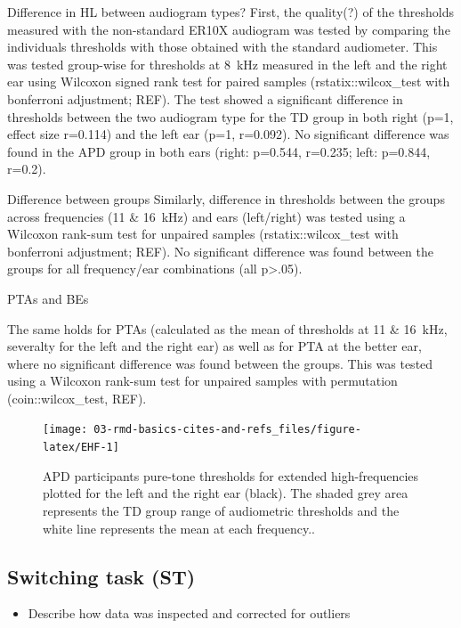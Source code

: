 \documentclass[a4paper,nobind]{templates/ociamthesis}
\providecommand{\tightlist}{%
  \setlength{\itemsep}{0pt}\setlength{\parskip}{0pt}}
\begin{document}
{Difference in HL between audiogram types?} First, the quality(?) of the
thresholds measured with the non-standard ER10X audiogram was tested by
comparing the individuals thresholds with those obtained with the
standard audiometer. This was tested group-wise for thresholds at 8~kHz
measured in the left and the right ear using Wilcoxon signed rank test
for paired samples (rstatix::wilcox\_test with bonferroni adjustment;
REF). The test showed a significant difference in thresholds between the
two audiogram type for the TD group in both right (p=1, effect size
r=0.114) and the left ear (p=1, r=0.092). No significant difference was
found in the APD group in both ears (right: p=0.544, r=0.235; left:
p=0.844, r=0.2).

{Difference between groups} Similarly, difference in thresholds between
the groups across frequencies (11 \& 16~kHz) and ears (left/right) was
tested using a Wilcoxon rank-sum test for unpaired samples
(rstatix::wilcox\_test with bonferroni adjustment; REF). No significant
difference was found between the groups for all frequency/ear
combinations (all p\textgreater.05).

{PTAs and BEs}

The same holds for PTAs (calculated as the mean of thresholds at 11 \&
16~kHz, severalty for the left and the right ear) as well as for PTA at
the better ear, where no significant difference was found between the
groups. This was tested using a Wilcoxon rank-sum test for unpaired
samples with permutation (coin::wilcox\_test, REF).

\begin{figure}

{\centering \texttt{[image: 03-rmd-basics-cites-and-refs\_files/figure-latex/EHF-1]} 

}

\caption{APD participants pure-tone thresholds for extended high-frequencies plotted for the left and the right ear (black). The shaded grey area represents the TD group range of audiometric thresholds and the white line represents the mean at each frequency..}\label{fig:EHF}
\end{figure}

\hypertarget{switching-task-st-1}{%
\subsection{Switching task (ST)}\label{switching-task-st-1}}

\begin{itemize}
\tightlist
\item
  Describe how data was inspected and corrected for outliers
\end{itemize}
\end{document}
